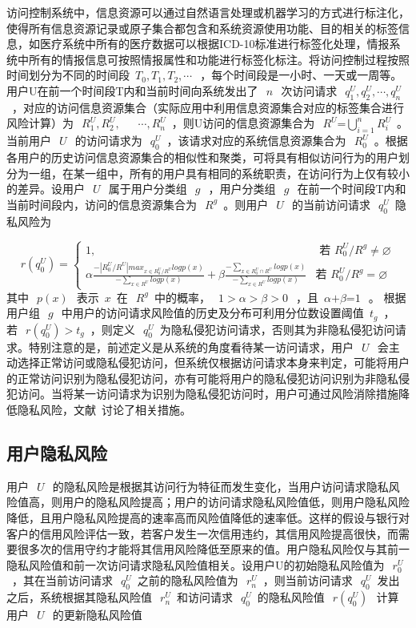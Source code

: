 访问控制系统中，信息资源可以通过自然语言处理或机器学习的方式进行标注化，使得所有信息资源记录或原子集合都包含和系统资源使用功能、目的相关的标签信息，如医疗系统中所有的医疗数据可以根据ICD-10标准进行标签化处理，情报系统中所有的情报信息可按照情报属性和功能进行标签化标注。将访问控制过程按照时间划分为不同的时间段~${{T}_{0}},{{T}_{1}},{{T}_{2}},\cdots ~$~，每个时间段是一小时、一天或一周等。用户U在前一个时间段T内和当前时间向系统发出了~$~n~$~次访问请求~$~q_{1}^{U},q_{2}^{U},\cdots ,q_{n}^{U}$~，对应的访问信息资源集合（实际应用中利用信息资源集合对应的标签集合进行风险计算）为~$~R_{1}^{U},R_{2}^{U},~$~ ~$\cdots ,R_{n}^{U}$~，则U访问的信息资源集合为~$~R_{{}}^{U}\text{=}\bigcup\nolimits_{i=1}^{n}{R_{i}^{U}}$~。当前用户~$~U~$~的访问请求为~$~q_{0}^{U}$~，该请求对应的系统信息资源集合为~$~R_{0}^{U}$~。根据各用户的历史访问信息资源集合的相似性和聚类，可将具有相似访问行为的用户划分为一组，在某一组中，所有的用户具有相同的系统职责，在访问行为上仅有较小的差异。设用户~$~U~$~属于用户分类组~$~g~$~，用户分类组~$~g~$~在前一个时间段T内和当前时间段内，访问的信息资源集合为~$~R_{{}}^{g}$~。则用户~$~U~$~的当前访问请求~$~q_{0}^{U}$~隐私风险为

\begin{equation}
r(q_{0}^{U})=\begin{cases}
1, & \text{ 若 } R_{0}^{U}/{{R}^{g}}\ne \varnothing \\ 
\alpha \frac{-|R_{0}^{U}/{R}^{U}|max_{x\in R_{0}^{U}/{R}^{U}}logp(x)}{-\sum_{x\in{R^U}}logp(x)}+ \beta \frac{-\sum_{x\in R_0^U \cap  R^U}logp(x)}{-\sum_{x\in  R^U}logp(x)}& \text{若 } R_{0}^{U}/{{R}^{g}}=\varnothing 
\end{cases}
\end{equation}
其中~$~p(x)~$~表示~$x$~在~$~R_{{}}^{g}$~中的概率，~$~1>\alpha >\beta >0~$~，且~$\alpha \text{+}\beta \text{=}1~$~。
根据用户组~$~g~$~中用户的访问请求风险值的历史及分布可利用分位数设置阈值~${{t}_{g}}$~，若~$~r(q_{0}^{U})>{{t}_{g}}$~，则定义~$~q_{0}^{U}$~为隐私侵犯访问请求，否则其为非隐私侵犯访问请求。特别注意的是，前述定义是从系统的角度看待某一访问请求，用户~$~U~$~会主动选择正常访问或隐私侵犯访问，但系统仅根据访问请求本身来判定，可能将用户的正常访问识别为隐私侵犯访问，亦有可能将用户的隐私侵犯访问识别为非隐私侵犯访问。当将某一访问请求为识别为隐私侵犯访问时，用户可通过风险消除措施降低隐私风险，文献~\cite{diaz-lopez2016dynamic}讨论了相关措施。

\subsection{用户隐私风险}
用户~$~U~$~的隐私风险是根据其访问行为特征而发生变化，当用户访问请求隐私风险值高，则用户的隐私风险提高；用户的访问请求隐私风险值低，则用户隐私风险降低，且用户隐私风险提高的速率高而风险值降低的速率低。这样的假设与银行对客户的信用风险评估一致，若客户发生一次信用违约，其信用风险提高很快，而需要很多次的信用守约才能将其信用风险降低至原来的值。用户隐私风险仅与其前一隐私风险值和前一次访问请求隐私风险值相关。设用户U的初始隐私风险值为~$~r_{0}^{U}$~，其在当前访问请求~$~q_{0}^{U}$~之前的隐私风险值为~$~r_{n}^{U}$~，则当前访问请求~$~q_{0}^{U}$~发出之后，系统根据其隐私风险值~$~r_{n}^{U}$~和访问请求~$~q_{0}^{U}$~的隐私风险值~$~r(q_{0}^{U})~$~计算用户~$~U~$~的更新隐私风险值

